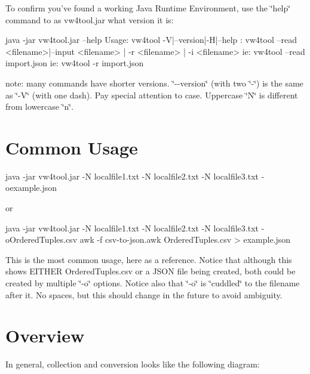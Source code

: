 To confirm you've found a working Java Runtime Environment, use the \char`\"{}help\char`\"{} command to as vw4tool.\+jar what version it is\+: \begin{DoxyVerb}java -jar vw4tool.jar --help
Usage: vw4tool -V|--version|-H|--help
     : vw4tool --read <filename>|--input <filename> | -r <filename> | -i <filename>
   ie: vw4tool --read import.json
   ie: vw4tool -r import.json
\end{DoxyVerb}


note\+: many commands have shorter versions. \char`\"{}-\/-\/version\char`\"{} (with two \char`\"{}-\/\char`\"{}) is the same as \char`\"{}-\/\+V\char`\"{} (with one dash). Pay special attention to case. Uppercase \char`\"{}\+N\char`\"{} is different from lowercase \char`\"{}n\char`\"{}.

\section*{Common Usage }

\begin{DoxyVerb}java -jar vw4tool.jar  -N localfile1.txt -N localfile2.txt -N localfile3.txt -oexample.json
\end{DoxyVerb}


or \begin{DoxyVerb}java -jar vw4tool.jar  -N localfile1.txt -N localfile2.txt -N localfile3.txt -oOrderedTuples.csv
awk -f csv-to-json.awk OrderedTuples.csv > example.json
\end{DoxyVerb}


This is the most common usage, here as a reference. Notice that although this shows E\+I\+T\+H\+E\+R Ordered\+Tuples.\+csv or a J\+S\+O\+N file being created, both could be created by multiple \char`\"{}-\/o\char`\"{} options. Notice also that \char`\"{}-\/o\char`\"{} is \char`\"{}cuddled\char`\"{} to the filename after it. No spaces, but this should change in the future to avoid ambiguity.

\section*{Overview }

In general, collection and conversion looks like the following diagram\+:

